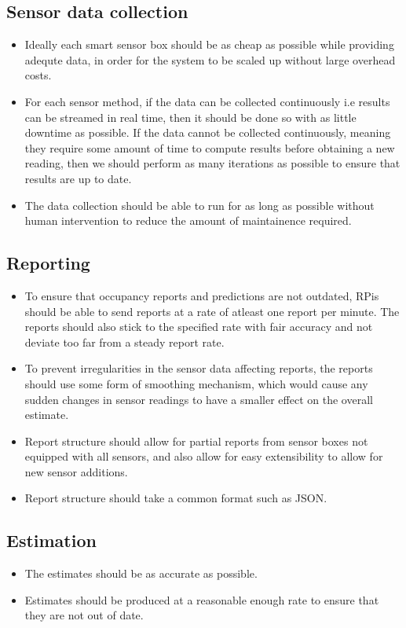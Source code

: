 \documentclass{l4proj}
\begin{document}
\subsection{Sensor data collection}
\begin{itemize}
  \item Ideally each smart sensor box should be as cheap as possible while providing adequte data, in order for the system to be scaled up without large overhead costs.
  \item For each sensor method, if the data can be collected continuously i.e results can be streamed in real time, then it should be done so with as little downtime as possible. If the data cannot be collected continuously, meaning they require some amount of time to compute results before obtaining a new reading, then we should perform as many iterations as possible to ensure that results are up to date.
  \item The data collection should be able to run for as long as possible without human intervention to reduce the amount of maintainence required.
\end{itemize}

\subsection{Reporting}
\begin{itemize}	
  \item To ensure that occupancy reports and predictions are not outdated, RPis should be able to send reports at a rate of atleast one report per minute. The reports should also stick to the specified rate with fair accuracy and not deviate too far from a steady report rate.
  \item To prevent irregularities in the sensor data affecting reports, the reports should use some form of smoothing mechanism, which would cause any sudden changes in sensor readings to have a smaller effect on the overall estimate.
  \item Report structure should allow for partial reports from sensor boxes not equipped with all sensors, and also allow for easy extensibility to allow for new sensor additions.
  \item Report structure should take a common format such as JSON.
\end{itemize}

\subsection{Estimation}
\begin{itemize}	
  \item The estimates should be as accurate as possible.
  \item Estimates should be produced at a reasonable enough rate to ensure that they are not out of date.
\end{itemize}
\end{document}
